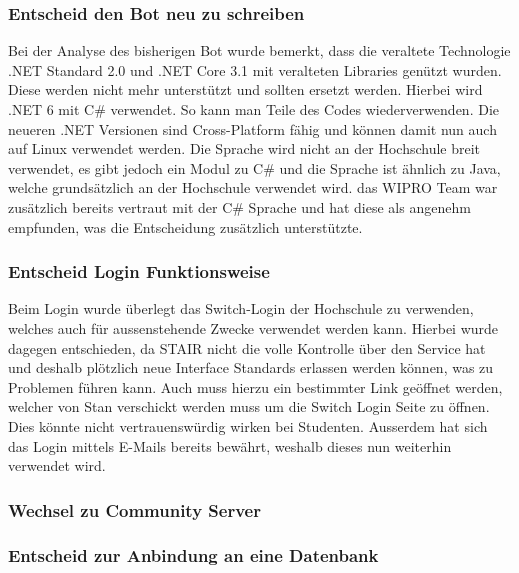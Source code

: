 \documentclass[a4paper, table]{article}
\begin{document}
\subsubsection*{Entscheid den Bot neu zu schreiben}

Bei der Analyse des bisherigen Bot wurde bemerkt, dass die veraltete Technologie .NET Standard 2.0 und .NET Core 3.1 mit veralteten Libraries genützt wurden.
Diese werden nicht mehr unterstützt und sollten ersetzt werden.
Hierbei wird .NET 6 mit C\# verwendet.
So kann man Teile des Codes wiederverwenden.
Die neueren .NET Versionen sind Cross-Platform fähig und können damit nun auch auf Linux verwendet werden.\autocite{de_george_installieren_nodate}
Die Sprache wird nicht an der Hochschule breit verwendet, es gibt jedoch ein Modul zu C\#\autocite{}  und die Sprache ist ähnlich zu Java,
welche grundsätzlich an der Hochschule verwendet wird. 
das WIPRO Team war zusätzlich bereits vertraut mit der C\# Sprache und hat diese als angenehm empfunden, was die Entscheidung zusätzlich unterstützte.

\subsubsection*{Entscheid Login Funktionsweise}
Beim Login wurde überlegt das Switch-Login der Hochschule zu verwenden, welches auch für aussenstehende Zwecke verwendet werden kann.
Hierbei wurde dagegen entschieden, da STAIR nicht die volle Kontrolle über den Service hat und deshalb plötzlich neue Interface Standards erlassen werden können, was zu Problemen führen kann.
Auch muss hierzu ein bestimmter Link geöffnet werden, welcher von Stan verschickt werden muss um die Switch Login Seite zu öffnen.
Dies könnte nicht vertrauenswürdig wirken bei Studenten.
Ausserdem hat sich das Login mittels E-Mails bereits bewährt, weshalb dieses nun weiterhin verwendet wird.

\subsubsection*{Wechsel zu Community Server}

\subsubsection*{Entscheid zur Anbindung an eine Datenbank}
\end{document}
